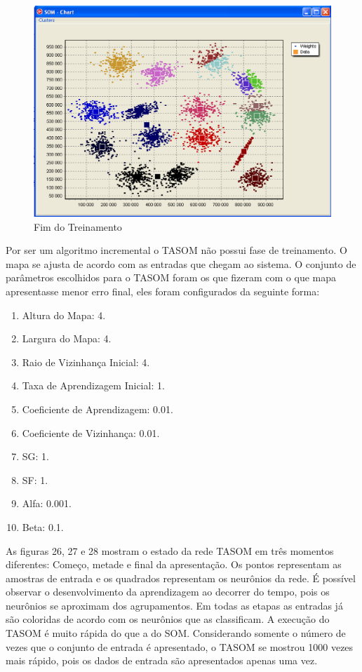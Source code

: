 \begin{figure}[!h]
\centering
\includegraphics[keepaspectratio=true,scale=0.5]
{figuras/som3.eps}
\caption{Fim do Treinamento}
\label{data_titatic}
\end{figure} 

Por ser um algoritmo incremental o TASOM não possui fase de treinamento. O mapa se ajusta de acordo com as entradas que chegam ao sistema. O conjunto de parâmetros escolhidos para o TASOM foram os que fizeram com o que mapa apresentasse menor erro final, eles foram configurados da seguinte forma: 

\begin{enumerate}
\item Altura do Mapa: 4.
\item Largura do Mapa: 4.
\item Raio de Vizinhança Inicial: 4.
\item Taxa de Aprendizagem Inicial: 1.
\item Coeficiente de Aprendizagem: 0.01.
\item Coeficiente de Vizinhança: 0.01.
\item SG: 1.
\item SF: 1.
\item Alfa: 0.001.
\item Beta: 0.1.
\end{enumerate}


As figuras 26, 27 e 28 mostram o estado da rede TASOM em três momentos diferentes: Começo, metade e final da apresentação. Os pontos representam as amostras de entrada e os quadrados representam os neurônios da rede. É possível observar o desenvolvimento da aprendizagem ao decorrer do tempo, pois os neurônios se aproximam dos agrupamentos. Em todas as etapas as entradas já são coloridas de acordo com os neurônios que as classificam. A execução do TASOM é muito rápida do que a do SOM. Considerando somente o número de vezes que o conjunto de entrada é apresentado, o TASOM se mostrou 1000 vezes mais rápido, pois os dados de entrada são apresentados apenas uma vez.


